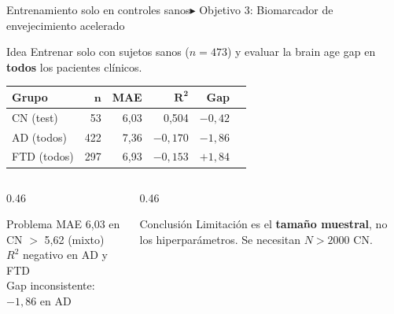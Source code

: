 \documentclass[aspectratio=169, 11pt]{beamer}
\newcommand{\highlight}[1]{\textcolor{uncaccent}{\textbf{#1}}}
\begin{document}
\begin{frame}{Entrenamiento solo en controles sanos}{\color{uncyellow}\scriptsize $\blacktriangleright$ Objetivo 3: Biomarcador de envejecimiento acelerado}
  \begin{block}{Idea}
    Entrenar solo con sujetos sanos ($n = 473$) y evaluar la brain age gap en \textbf{todos} los pacientes clínicos.
  \end{block}

  \vspace{0.15cm}
  \centering
  {\small
  \begin{tabular}{lrrrrr}
    \toprule
    \textbf{Grupo} & $\boldsymbol{n}$ & \textbf{MAE} & $\boldsymbol{R^2}$ & \textbf{Gap} \\
    \midrule
    CN (test)   & 53  & 6,03 & 0,504    & $-0{,}42$ \\
    AD (todos)  & 422 & 7,36 & $-0,170$ & $-1{,}86$ \\
    FTD (todos) & 297 & 6,93 & $-0,153$ & $+1{,}84$ \\
    \bottomrule
  \end{tabular}}

  \vspace{0.2cm}
  \begin{columns}[T]
    \begin{column}{0.46\textwidth}
      \begin{alertblock}{Problema}
        {\small MAE 6,03 en CN $>$ 5,62 (mixto)\\
        $R^2$ negativo en AD y FTD\\
        Gap inconsistente: $-1{,}86$ en AD}
      \end{alertblock}
    \end{column}
    \begin{column}{0.46\textwidth}
      \begin{block}{Conclusión}
        {\small Limitación es el \highlight{tamaño muestral}, no los hiperparámetros. Se necesitan $N > 2000$ CN.}
      \end{block}
    \end{column}
  \end{columns}
\end{frame}
\end{document}
